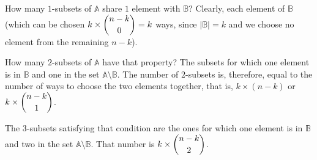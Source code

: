 \documentclass[11pt]{book}
\theoremstyle{definition}
\theoremstyle{plain}
\theoremstyle{definition}
\theoremstyle{problemstyle}
\theoremstyle{remark}
\theoremstyle{definition}
\begin{document}
How many $1$-subsets of $\mathbb{A}$ share $1$ element with $\mathbb{B}$? Clearly, each element of $\mathbb{B}$ (which can be chosen $k\times\dbinom{n-k}{0}=k$ ways, since $\lvert\mathbb{B}\rvert=k$ and we choose no element from the remaining $n-k$). 

How many $2$-subsets of $\mathbb{A}$ have that property? The subsets for which one element is in $\mathbb{B}$ and one in the set $\mathbb{A}\setminus\mathbb{B}$. The number of $2$-subsets is, therefore, equal to the number of ways to choose the two elements together, that is, $k\times(n-k)$ or $k\times\dbinom{n-k}{1}$.

The $3$-subsets satisfying that condition are the ones for which one element is in $\mathbb{B}$ and two in the set $\mathbb{A}\setminus\mathbb{B}$. That number is $k\times\dbinom{n-k}{2}$. 
\end{document}
